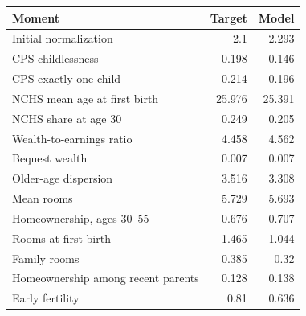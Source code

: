 \begingroup\small
\setlength{\tabcolsep}{3pt}
\renewcommand{\arraystretch}{1.04}
\begin{tabularx}{\linewidth}{Xrr}
\toprule
Moment & Target & Model \\
\midrule
Initial normalization & 2.1 & 2.293 \\
CPS childlessness & 0.198 & 0.146 \\
CPS exactly one child & 0.214 & 0.196 \\
NCHS mean age at first birth & 25.976 & 25.391 \\
NCHS share at age 30 & 0.249 & 0.205 \\
Wealth-to-earnings ratio & 4.458 & 4.562 \\
Bequest wealth & 0.007 & 0.007 \\
Older-age dispersion & 3.516 & 3.308 \\
Mean rooms & 5.729 & 5.693 \\
Homeownership, ages 30--55 & 0.676 & 0.707 \\
Rooms at first birth & 1.465 & 1.044 \\
Family rooms & 0.385 & 0.32 \\
Homeownership among recent parents & 0.128 & 0.138 \\
Early fertility & 0.81 & 0.636 \\
\bottomrule
\end{tabularx}
\endgroup
